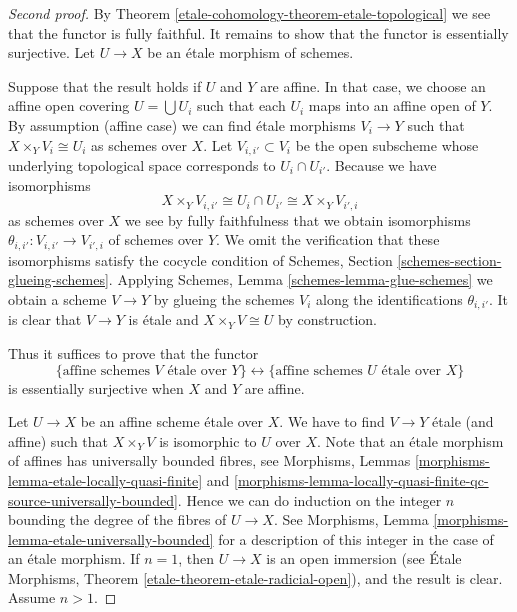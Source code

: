 \begin{proof}[Second proof]
By Theorem \ref{etale-cohomology-theorem-etale-topological}
we see that the functor is fully faithful.
It remains to show that the functor is essentially surjective.
Let $U \to X$ be an \'etale morphism of schemes.

\medskip\noindent
Suppose that the result holds if $U$ and $Y$ are affine.
In that case, we choose an affine open covering
$U = \bigcup U_i$ such that each $U_i$ maps
into an affine open of $Y$. By assumption (affine case) we can
find \'etale morphisms $V_i \to Y$ such that $X \times_Y V_i \cong U_i$
as schemes over $X$. Let $V_{i, i'} \subset V_i$
be the open subscheme whose underlying topological space
corresponds to $U_i \cap U_{i'}$. Because we have isomorphisms
$$
X \times_Y V_{i, i'} \cong U_i \cap U_{i'} \cong X \times_Y V_{i', i}
$$
as schemes over $X$ we see by fully faithfulness that we
obtain isomorphisms
$\theta_{i, i'} : V_{i, i'} \to V_{i', i}$ of schemes over $Y$.
We omit the verification that these isomorphisms satisfy the
cocycle condition of Schemes, Section \ref{schemes-section-glueing-schemes}.
Applying Schemes, Lemma \ref{schemes-lemma-glue-schemes}
we obtain a scheme $V \to Y$ by
glueing the schemes $V_i$ along the identifications $\theta_{i, i'}$.
It is clear that $V \to Y$ is \'etale and $X \times_Y V \cong U$
by construction.

\medskip\noindent
Thus it suffices to prove that the functor
\begin{equation}
\label{equation-affine-etale}
\{
\text{affine schemes }V\text{ \'etale over }Y
\}
\leftrightarrow
\{
\text{affine schemes }U\text{ \'etale over }X
\}
\end{equation}
is essentially surjective when $X$ and $Y$ are affine.

\medskip\noindent
Let $U \to X$ be an affine scheme \'etale over $X$.
We have to find $V \to Y$ \'etale (and affine) such that $X \times_Y V$
is isomorphic to $U$ over $X$. Note that an \'etale morphism of affines
has universally bounded fibres, see
Morphisms,
Lemmas \ref{morphisms-lemma-etale-locally-quasi-finite} and
\ref{morphisms-lemma-locally-quasi-finite-qc-source-universally-bounded}.
Hence we can do induction on the integer $n$ bounding the degree of the fibres
of $U \to X$. See
Morphisms, Lemma \ref{morphisms-lemma-etale-universally-bounded}
for a description of this integer in the case of an \'etale morphism.
If $n = 1$, then $U \to X$ is an open immersion (see
\'Etale Morphisms, Theorem \ref{etale-theorem-etale-radicial-open}),
and the result is clear. Assume $n > 1$.


\end{proof}
